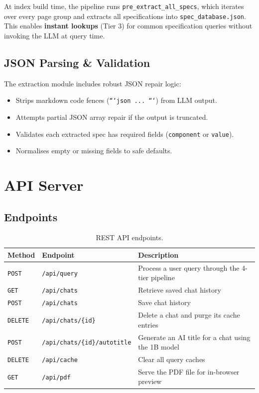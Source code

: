 \documentclass[12pt, a4paper]{article}
\begin{document}
At index build time, the pipeline runs \texttt{pre\_extract\_all\_specs}, which iterates over every page group and extracts all specifications into \texttt{spec\_database.json}. This enables \textbf{instant lookups} (Tier 3) for common specification queries without invoking the LLM at query time.

\subsection{JSON Parsing \& Validation}

The extraction module includes robust JSON repair logic:
\begin{itemize}[itemsep=2pt]
  \item Strips markdown code fences (\texttt{```json ... ```}) from LLM output.
  \item Attempts partial JSON array repair if the output is truncated.
  \item Validates each extracted spec has required fields (\texttt{component} or \texttt{value}).
  \item Normalises empty or missing fields to safe defaults.
\end{itemize}

\section{API Server}

\subsection{Endpoints}

\begin{table}[H]
\centering
\caption{REST API endpoints.}
\begin{tabularx}{\textwidth}{l l X}
\toprule
\textbf{Method} & \textbf{Endpoint} & \textbf{Description} \\
\midrule
\texttt{POST}   & \texttt{/api/query}              & Process a user query through the 4-tier pipeline \\
\texttt{GET}    & \texttt{/api/chats}              & Retrieve saved chat history \\
\texttt{POST}   & \texttt{/api/chats}              & Save chat history \\
\texttt{DELETE} & \texttt{/api/chats/\{id\}}        & Delete a chat and purge its cache entries \\
\texttt{POST}   & \texttt{/api/chats/\{id\}/autotitle} & Generate an AI title for a chat using the 1B model \\
\texttt{DELETE} & \texttt{/api/cache}              & Clear all query caches \\
\texttt{GET}    & \texttt{/api/pdf}                & Serve the PDF file for in-browser preview \\
\bottomrule
\end{tabularx}
\end{table}
\end{document}
